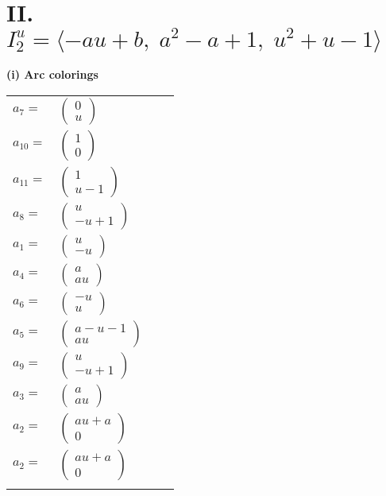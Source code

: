 \documentclass[1p]{elsarticle_modified}
\theoremstyle{definition}
\begin{document}
\centering \section*{II. $I^u_{2}= \langle - a u+b,\;a^2- a+1,\;u^2+u-1 \rangle$}
\flushleft \textbf{(i) Arc colorings}\\
\begin{tabular}{m{7pt} m{180pt} m{7pt} m{180pt} }
\flushright $a_{7}=$&$\begin{pmatrix}0\\u\end{pmatrix}$ \\
\flushright $a_{10}=$&$\begin{pmatrix}1\\0\end{pmatrix}$ \\
\flushright $a_{11}=$&$\begin{pmatrix}1\\u-1\end{pmatrix}$ \\
\flushright $a_{8}=$&$\begin{pmatrix}u\\- u+1\end{pmatrix}$ \\
\flushright $a_{1}=$&$\begin{pmatrix}u\\- u\end{pmatrix}$ \\
\flushright $a_{4}=$&$\begin{pmatrix}a\\a u\end{pmatrix}$ \\
\flushright $a_{6}=$&$\begin{pmatrix}- u\\u\end{pmatrix}$ \\
\flushright $a_{5}=$&$\begin{pmatrix}a- u-1\\a u\end{pmatrix}$ \\
\flushright $a_{9}=$&$\begin{pmatrix}u\\- u+1\end{pmatrix}$ \\
\flushright $a_{3}=$&$\begin{pmatrix}a\\a u\end{pmatrix}$ \\
\flushright $a_{2}=$&$\begin{pmatrix}a u+a\\0\end{pmatrix}$\\ \flushright $a_{2}=$&$\begin{pmatrix}a u+a\\0\end{pmatrix}$\\&\end{tabular}
\end{document}
